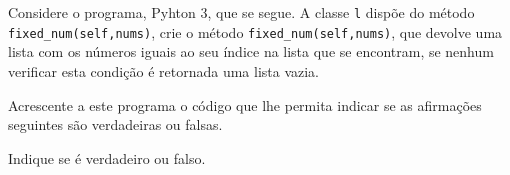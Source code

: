 \documentclass[12pt,varwidth=16cm,border=1pt]{standalone}
\begin{document}
Considere o programa, Pyhton 3, que se segue. A classe \verb+l+ dispõe do método \verb+fixed_num(self,nums)+, crie o método \verb+fixed_num(self,nums)+, que devolve uma lista com os números iguais ao seu índice na lista que se encontram, se nenhum verificar esta condição é retornada uma lista vazia.



Acrescente a este programa o código que lhe permita indicar se as
afirmações seguintes são verdadeiras ou falsas.

Indique se é verdadeiro ou falso.
\end{document}
